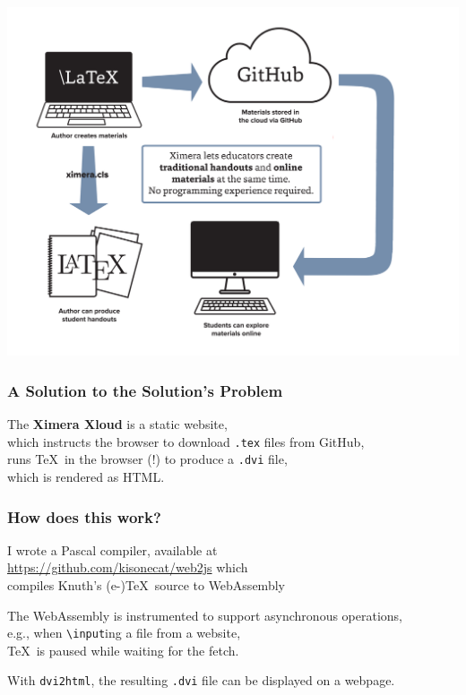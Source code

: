 \documentclass[aspectratio=169,14pt]{beamer}
\begin{document}
\begin{frame}
  \begin{center}
    \includegraphics[height=\textheight]{XimeraGraphicNO-SERVER.png}
  \end{center}
\end{frame}

\begin{frame}
  \frametitle{A Solution to the Solution's Problem}

  The \textbf{Ximera Xloud} is a static website, \\
  \quad which instructs the browser to download \texttt{.tex} files from GitHub, \\
  \quad runs \TeX\ in the browser (!) to produce a \texttt{.dvi} file, \\
  \quad which is rendered as HTML. \\

\end{frame}

\begin{frame}
  \frametitle{How does this work?}

  I wrote a Pascal compiler, available at\\
  \quad \url{https://github.com/kisonecat/web2js} which\\
  \quad compiles Knuth's (e-)\TeX\ source to WebAssembly

  \vfill
  
  The WebAssembly is instrumented to support asynchronous operations, \\
  \quad e.g., when \texttt{\textbackslash input}ing a file from a website, \\
  \quad\quad \TeX\ is paused while waiting for the fetch.

  \vfill
  
  With \texttt{dvi2html}, the resulting \texttt{.dvi} file can be
  displayed on a webpage.

  \vfill
  
\end{frame}
\end{document}
